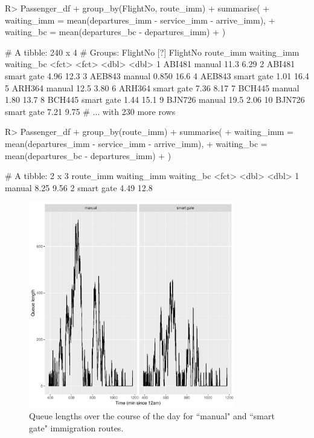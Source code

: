 \documentclass[article]{jss}
\begin{document}
\begin{CodeChunk}
\begin{Sinput}
R> Passenger_df %
+    group_by(FlightNo, route_imm) %
+    summarise(
+      waiting_imm = mean(departures_imm - service_imm - arrive_imm), 
+      waiting_bc = mean(departures_bc - departures_imm)
+    )
\end{Sinput}
\begin{Soutput}
# A tibble: 240 x 4
# Groups:   FlightNo [?]
   FlightNo route_imm  waiting_imm waiting_bc
   <fct>    <fct>            <dbl>      <dbl>
 1 ABI481   manual          11.3         6.29
 2 ABI481   smart gate       4.96       12.3 
 3 AEB843   manual           0.850      16.6 
 4 AEB843   smart gate       1.01       16.4 
 5 ARH364   manual          12.5         3.80
 6 ARH364   smart gate       7.36        8.17
 7 BCH445   manual           1.80       13.7 
 8 BCH445   smart gate       1.44       15.1 
 9 BJN726   manual          19.5         2.06
10 BJN726   smart gate       7.21        9.75
# ... with 230 more rows
\end{Soutput}
\begin{Sinput}
R> Passenger_df %
+    group_by(route_imm) %
+    summarise(
+      waiting_imm = mean(departures_imm - service_imm - arrive_imm), 
+      waiting_bc = mean(departures_bc - departures_imm)
+    )
\end{Sinput}
\begin{Soutput}
# A tibble: 2 x 3
  route_imm  waiting_imm waiting_bc
  <fct>            <dbl>      <dbl>
1 manual            8.25       9.56
2 smart gate        4.49      12.8
\end{Soutput}
\end{CodeChunk}

\begin{figure}[!htb]
\centering
\includegraphics[width = 0.8\textwidth]{Figures/queuelength_dplyr.pdf}
\caption{Queue lengths over the course of the day for ``manual" and ``smart gate" immigration routes. }
\label{fig:queuelength_dplyr}
\end{figure}
\end{document}

